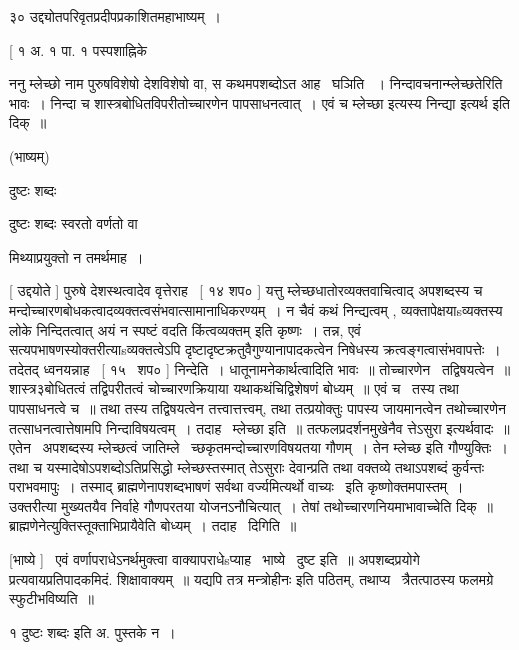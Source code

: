 \documentclass[11pt, openany]{book}
\begin{document}
३० उद्द्योतपरिवृतप्रदीपप्रकाशितमहाभाष्यम्~। 

 [ १ अ. १ पा. १ पस्पशाह्निके



ननु म्लेच्छो नाम पुरुषविशेषो देशविशेषो वा, स कथमपशब्दोऽत आह \textendash\ घञिति
~। निन्दावचनान्म्लेच्छतेरिति भावः~। निन्दा च शास्त्रबोधितविपरीतोच्चारणेन
पापसाधनत्वात्~। एवं च म्लेच्छा इत्यस्य निन्द्या इत्यर्थ इति दिक्~॥ 

 (भाष्यम्) 

दुष्टः शब्दः \textendash\ 

 दुष्टः शब्दः स्वरतो वर्णतो वा 

 मिथ्याप्रयुक्तो न तमर्थमाह~। 



 [ उद्दयोते ] पुरुषे देशस्थत्वादेव वृत्तेराह \textendash\ [ १४ शप० ] यत्तु
म्लेच्छधातोरव्यक्तवाचित्वाद् अपशब्दस्य च
मन्दोच्चारणबोधकत्वादव्यक्तत्वसंभवात्सामानाधिकरण्यम्~। न चैवं कथं
निन्द्यत्वम् , व्यक्तापेक्षयाsव्यक्तस्य लोके निन्दितत्वात् {\qt अयं न}
स्पष्टं वदति किंत्वव्यक्तम् इति कृष्णः~। तन्न, एवं
सत्यपभाषणस्योक्तरीत्याsव्यक्तत्वेऽपि दृष्टादृष्टक्रतुवैगुण्यानापादकत्वेन
निषेधस्य क्रत्वङ्गत्वासंभवापत्तेः~। तदेतद् ध्वनयन्नाह \textendash\ [ १५ \textendash\ शप० ]
निन्देति~। धातूनामनेकार्थत्वादिति भावः~॥ तोच्चारणेन \textendash\ तद्विषयत्वेन~॥
शास्त्र३बोधितत्वं तद्विपरीतत्वं चोच्चारणक्रियाया यथाकथंचिद्विशेषणं
बोध्यम्~॥ एवं च \textendash\ तस्य तथा पापसाधनत्वे च~॥ तथा तस्य तद्विषयत्वेन
तत्त्वात्तत्त्वम्, तथा तत्प्रयोक्तुः पापस्य जायमानत्वेन तथोच्चारणेन
तत्साधनत्वात्तेषामपि निन्दाविषयत्वम्~। तदाह \textendash\ म्लेच्छा इति~॥
तत्फलप्रदर्शनमुखेनैव त्तेऽसुरा इत्यर्थवादः~॥ एतेन \textendash\ अपशब्दस्य म्लेच्छत्वं
जातिम्ले \textendash\ च्छकृतमन्दोच्चारणविषयतया गौणम्~। तेन म्लेच्छ इति गौण्युक्तिः~। 
तथा च यस्मादेषोऽपशब्दोऽतिप्रसिद्धो म्लेच्छस्तस्मात् तेऽसुराः देवान्प्रति
तथा वक्तव्ये तथाऽपशब्दं कुर्वन्तः पराभवमापुः~। तस्माद्
ब्राह्मणेनापशब्दभाषणं सर्वथा वर्ज्यमित्यर्थो वाच्यः \textendash\ इति
कृष्णोक्तमपास्तम्~। उक्तरीत्या मुख्यतयैव निर्वाहे गौणपरतया
योजनऽनौचित्यात्~। तेषां तथोच्चारणनियमाभावाच्चेति दिक्~॥
ब्राह्मणेनेत्युक्तिस्तूक्ताभिप्रायैवेति बोध्यम्~। तदाह \textendash\ दिगिति~॥ 

 [भाष्ये ] \textendash\ एवं वर्णापराधेऽनर्थमुक्त्वा वाक्यापराधेsप्याह \textendash\ 
भाष्ये \textendash\ दुष्ट इति~॥ अपशब्दप्रयोगे प्रत्यवायप्रतिपादकमिदं.
शिक्षावाक्यम्~॥ यद्यपि तत्र {\qt मन्त्रोहीनः} इति पठितम्, तथाप्य \textendash\ 
त्रैतत्पाठस्य फलमग्रे स्फुटीभविष्यति~॥ 



१ {\qt दुष्टः शब्दः} इति अ. पुस्तके न~। 
\end{document}
